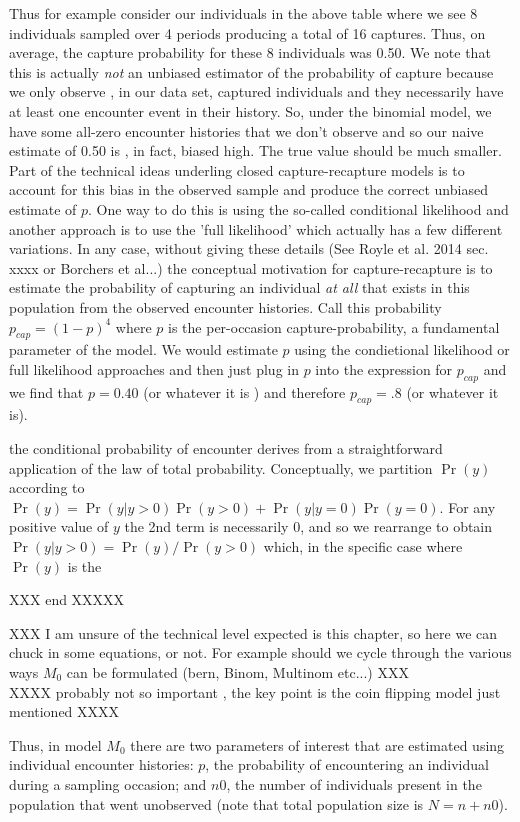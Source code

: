 \documentclass{book}
\begin{document}
Thus for example consider our individuals in the above
table where we see 8 individuals sampled over 4 periods producing a
total of 16 captures. Thus, on average, the capture probability for
these 8 individuals was 0.50. We note that this is actually {\it not}
an unbiased estimator of the probability of capture because we only
observe , in our data set, captured individuals and they necessarily
have at least one encounter event in their history. So, under the
binomial model, we have some all-zero encounter histories that we
don't observe and so our naive estimate of 0.50 is , in fact, biased
high. The true value should be much smaller. Part of the technical
ideas underling closed capture-recapture models is to account for this
bias in the observed sample and produce the correct unbiased estimate
of $p$. One way to do this is using the so-called conditional
likelihood and another approach is to use the 'full likelihood' which
actually has a few different variations.  In any case, without giving
these details (See Royle et al. 2014 sec. xxxx or Borchers et al...)
the conceptual motivation for capture-recapture is to estimate
 the probability of  capturing an individual {\it at all} that
exists
in this population from the observed encounter histories.
Call this  probability $p_{cap} = (1-p)^4$ where $p$ is the
per-occasion capture-probability, a fundamental parameter of the
model. We would estimate $p$ using the condietional likelihood or full
likelihood approaches and then just plug in $p$ into the expression
for $p_{cap}$ and we find that $p= 0.40$ (or whatever it is ) and
therefore
$p_{cap} =  .8$ (or whatever it is).

the conditional probability of encounter
 derives from a straightforward application of the law of total
probability. Conceptually, we partition $\Pr(y)$ according to
$\Pr(y) = \Pr(y|y>0)\Pr(y>0) + \Pr(y|y=0)\Pr(y=0)$. For any positive
value of $y$ the 2nd term is necessarily 0, and so we rearrange to
obtain
$\Pr(y|y>0) = \Pr(y)/\Pr(y>0)$ which, in the specific case where
$\Pr(y)$ is the

XXX end XXXXX

XXX I am unsure of the technical level expected is this chapter, so here we can chuck in some equations, or not. For example should we cycle through the various ways $M_0$ can be formulated (bern, Binom, Multinom etc...) XXX\\
XXXX probably not so important , the key point is the coin flipping
model just mentioned XXXX


Thus, in model $M_0$ there are two parameters of interest that are
estimated using individual encounter histories: $p$, the probability
of encountering an individual during a sampling occasion; and $n0$,
the number of individuals present in the population that went
unobserved (note that total population size is $N = n + n0$).
\end{document}
